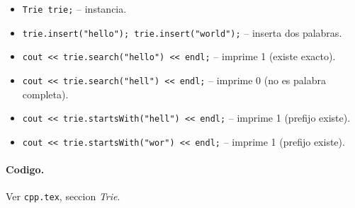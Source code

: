 \begin{itemize}\setlength\itemsep{0pt}
	\item \texttt{Trie trie;} -- instancia.
	\item \texttt{trie.insert("hello"); trie.insert("world");} -- inserta dos palabras.
	\item \texttt{cout << trie.search("hello") << endl;} -- imprime 1 (existe exacto).
	\item \texttt{cout << trie.search("hell") << endl;} -- imprime 0 (no es palabra completa).
	\item \texttt{cout << trie.startsWith("hell") << endl;} -- imprime 1 (prefijo existe).
	\item \texttt{cout << trie.startsWith("wor") << endl;} -- imprime 1 (prefijo existe).
\end{itemize}

\paragraph{Codigo.}
Ver \texttt{cpp.tex}, seccion \textit{Trie}.
